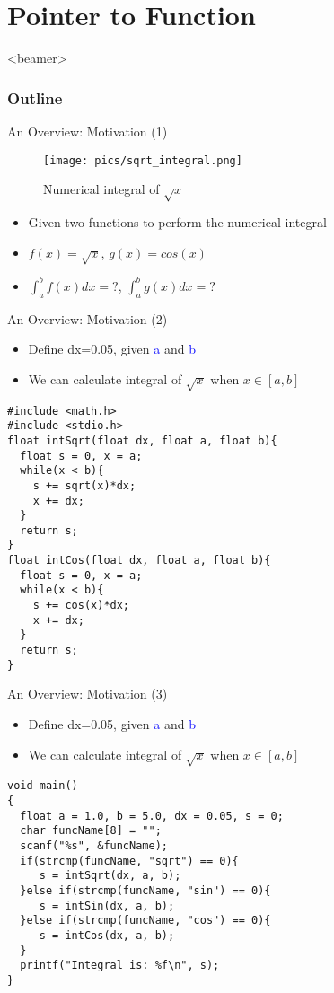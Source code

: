 \section{Pointer to Function}
\label{sec:p2func}
\begin{frame}<beamer>
    \frametitle{Outline}
    \tableofcontents[currentsection]
\end{frame}

\begin{frame}{An Overview: Motivation (1)}
\begin{figure}
	\texttt{[image: pics/sqrt\_integral.png]}
	\caption{Numerical integral of $\sqrt{x}$}
\end{figure}

\begin{itemize}
	\item {Given two functions to perform the numerical integral}
	\item {$f(x)=\sqrt{x}$, $g(x)=cos(x)$}
	\item {$\int_a^bf(x)dx = ?$, $\int_a^bg(x)dx = ?$}
\end{itemize}

\end{frame}

\begin{frame}[fragile]{An Overview: Motivation (2)}
\begin{itemize}
	\item {Define dx=0.05, given \textcolor{blue}{a} and \textcolor{blue}{b}}
	\item {We can calculate integral of $\sqrt{x}$ when  $x \in [a, b]$}
\end{itemize}
\begin{lstlisting}[xleftmargin=0.08\linewidth, linewidth=0.9\linewidth]
#include <math.h>
#include <stdio.h>
float intSqrt(float dx, float a, float b){
  float s = 0, x = a;
  while(x < b){
    s += sqrt(x)*dx;
    x += dx;
  }
  return s;
}
float intCos(float dx, float a, float b){
  float s = 0, x = a;
  while(x < b){
    s += cos(x)*dx;
    x += dx;
  }
  return s;
}
\end{lstlisting}
\end{frame}

\begin{frame}[fragile]{An Overview: Motivation (3)}
\begin{itemize}
	\item {Define dx=0.05, given \textcolor{blue}{a} and \textcolor{blue}{b}}
	\item {We can calculate integral of $\sqrt{x}$ when $x \in [a, b]$}
\end{itemize}
\begin{lstlisting}[xleftmargin=0.08\linewidth, linewidth=0.9\linewidth,firstnumber=19]
void main()
{
  float a = 1.0, b = 5.0, dx = 0.05, s = 0;
  char funcName[8] = "";
  scanf("%s", &funcName);
  if(strcmp(funcName, "sqrt") == 0){
     s = intSqrt(dx, a, b);
  }else if(strcmp(funcName, "sin") == 0){
     s = intSin(dx, a, b);  
  }else if(strcmp(funcName, "cos") == 0){
     s = intCos(dx, a, b);    
  }
  printf("Integral is: %f\n", s);
}
\end{lstlisting}
\end{frame}


